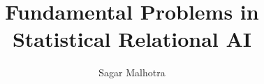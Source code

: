 \documentclass[runningheads]{llncs}
\begin{document}
\title{Fundamental Problems in Statistical Relational AI}

%
\author{Sagar Malhotra}


%
%
 
\maketitle              %
% 



% 
% 
% 
% 
% 
% 
%
%
% 
%
% 



% 


% 
\end{document}
